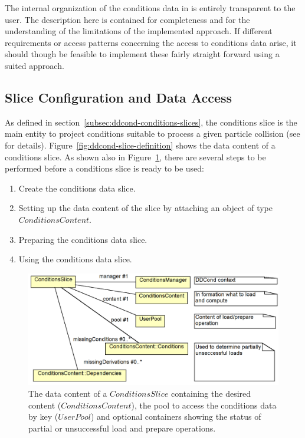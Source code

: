 \documentclass[10pt,a4paper]{article}
\begin{document}
\noindent
The internal organization of the conditions data in \DDC is entirely 
transparent to the user. The description here is contained for
completeness and for the understanding of the limitations of the implemented
approach. If different requirements or access patterns concerning the 
access to conditions data arise, it should though be feasible to implement
these fairly straight forward using a suited approach.

\subsection{Slice Configuration and Data Access}
\label{subsec:ddcond-data-access}

\noindent
As defined in section~\ref{subsec:ddcond-conditions-slices}, the conditions slice
is the main entity to project conditions suitable to process a given particle
collision (see 
for details). Figure~\ref{fig:ddcond-slice-definition} shows the data content of a 
conditions slice.
As shown also in Figure~\ref{fig:ddcond-slice-usage}, there are 
several steps to be performed before a conditions slice is ready to be used:
\begin{enumerate}\itemcompact
\item Create the conditions data slice.
\item Setting up the data content of the slice by attaching an object of type
      $ConditionsContent$.
\item Preparing the conditions data slice.
\item Using the conditions data slice.
\end{enumerate}

\begin{figure}[h]
  \begin{center}\includegraphics[width=12cm] {DDCond-ConditionsSlice.png}
    \caption{The data content of a $ConditionsSlice$ containing the 
             desired content ($ConditionsContent$), the pool to access the
             conditions data by key ($UserPool$) and optional containers
             showing the status of partial or unsuccessful load and prepare operations.}
    \label{fig:ddcond-slice-usage}
  \end{center}
\end{figure}
\end{document}
